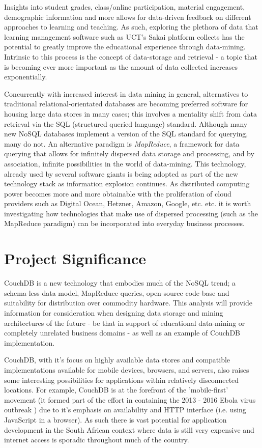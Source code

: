 Insights into student grades, class/online participation, material engagement, demographic information and more allows for data-driven feedback on different approaches to learning and teaching. As such, exploring the plethora of data that learning management software such as UCT's Sakai platform collects has the potential to greatly improve the educational experience through data-mining. Intrinsic to this process is the concept of data-storage and retrieval - a topic that is becoming ever more important as the amount of data collected increases exponentially.

Concurrently with increased interest in data mining in general, alternatives to traditional relational-orientated databases are becoming preferred software for housing large data stores in many cases; this involves a mentality shift from data retrieval via the SQL (structured queried language) standard. Although many new NoSQL databases implement a version of the SQL standard for querying, many do not. An alternative paradigm is \textit{MapReduce}, a framework for data querying that allows for infinitely dispersed data storage and processing, and by association, infinite possibilities in the world of data-mining. This technology, already used by several software giants \cite{chandar2010} is being adopted as part of the new technology stack as information explosion continues. As distributed computing power becomes more and more obtainable with the proliferation of cloud providers such as Digital Ocean, Hetzner, Amazon, Google, etc. etc. it is worth investigating how technologies that make use of dispersed processing (such as the MapReduce paradigm) can be incorporated into everyday business processes.

\section{Project Significance}
CouchDB is a new technology that embodies much of the NoSQL trend; a schema-less data model, MapReduce queries, open-source code-base and suitability for distribution over commodity hardware. This analysis will provide information for consideration when designing data storage and mining architectures of the future - be that in support of educational data-mining or completely unrelated business domains - as well as an example of CouchDB implementation.

CouchDB, with it's focus on highly available data stores and compatible implementations available for mobile devices, browsers, and servers, also raises some interesting possibilities for applications within relatively disconnected locations. For example, CouchDB is at the forefront of the 'mobile-first' movement (it formed part of the effort in containing the 2013 - 2016 Ebola virus outbreak \cite{ebola2017}) due to it's emphasis on availability and HTTP interface (i.e. using JavaScript in a browser). As such there is vast potential for application development in the South African context where data is still very expensive and internet access is sporadic throughout much of the country.

